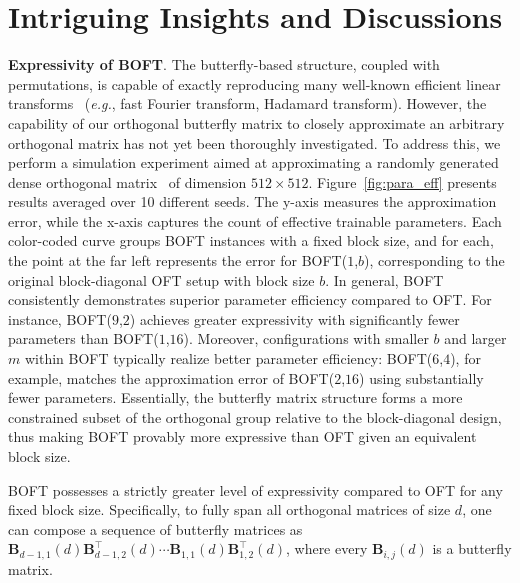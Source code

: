 \section{Intriguing Insights and Discussions}

\textbf{Expressivity of BOFT}. The butterfly-based structure, coupled with permutations, is capable of exactly reproducing many well-known efficient linear transforms~\cite{dao2019learning,dao2019kaleidoscope} (\emph{e.g.}, fast Fourier transform, Hadamard transform). However, the capability of our orthogonal butterfly matrix to closely approximate an arbitrary orthogonal matrix has not yet been thoroughly investigated. To address this, we perform a simulation experiment aimed at approximating a randomly generated dense orthogonal matrix~\cite{anderson1987generation} of dimension $512\times 512$. Figure~\ref{fig:para_eff} presents results averaged over 10 different seeds. The y-axis measures the approximation error, while the x-axis captures the count of effective trainable parameters. Each color-coded curve groups BOFT instances with a fixed block size, and for each, the point at the far left represents the error for BOFT($1$,$b$), corresponding to the original block-diagonal OFT setup with block size $b$. In general, BOFT consistently demonstrates superior parameter efficiency compared to OFT. For instance, BOFT($9$,$2$) achieves greater expressivity with significantly fewer parameters than BOFT($1$,$16$). Moreover, configurations with smaller $b$ and larger $m$ within BOFT typically realize better parameter efficiency: BOFT($6$,$4$), for example, matches the approximation error of BOFT($2$,$16$) using substantially fewer parameters. Essentially, the butterfly matrix structure forms a more constrained subset of the orthogonal group relative to the block-diagonal design, thus making BOFT provably more expressive than OFT given an equivalent block size.

\begin{theorem}\label{thm:exp_boft}
    BOFT possesses a strictly greater level of expressivity compared to OFT for any fixed block size. Specifically, to fully span all orthogonal matrices of size $d$, one can compose a sequence of butterfly matrices as $\bm{B}_{d-1,1}(d)\bm{B}^\top_{d-1,2}(d)\cdots\bm{B}_{1,1}(d)\bm{B}^\top_{1,2}(d)$, where every $\bm{B}_{i,j}(d)$ is a butterfly matrix.
\end{theorem}

